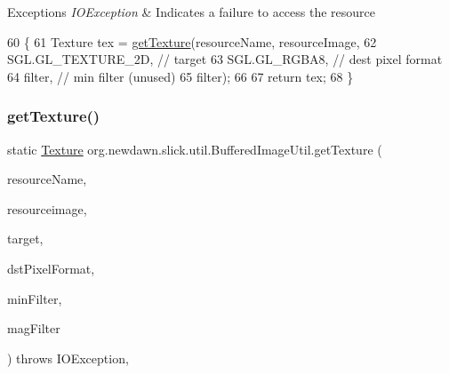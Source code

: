 \begin{DoxyExceptions}{Exceptions}
{\em I\+O\+Exception} & Indicates a failure to access the resource \\
\hline
\end{DoxyExceptions}

\begin{DoxyCode}
60                                                                         \{
61         Texture tex = \mbox{\hyperlink{classorg_1_1newdawn_1_1slick_1_1util_1_1_buffered_image_util_a60639f0e446fa211b987096681b98615}{getTexture}}(resourceName, resourceImage,
62                 SGL.GL\_TEXTURE\_2D, \textcolor{comment}{// target}
63                 SGL.GL\_RGBA8, \textcolor{comment}{// dest pixel format}
64                 filter, \textcolor{comment}{// min filter (unused)}
65                 filter);
66 
67         \textcolor{keywordflow}{return} tex;
68     \}
\end{DoxyCode}
\mbox{\label{classorg_1_1newdawn_1_1slick_1_1util_1_1_buffered_image_util_adeb7dc3f0a04a157bceb0a2e1aeaf57a}} 
\subsubsection{\texorpdfstring{get\+Texture()}{getTexture()}\hspace{0.1cm}{\footnotesize\ttfamily [3/3]}}
{\footnotesize\ttfamily static \mbox{\hyperlink{interfaceorg_1_1newdawn_1_1slick_1_1opengl_1_1_texture}{Texture}} org.\+newdawn.\+slick.\+util.\+Buffered\+Image\+Util.\+get\+Texture (\begin{DoxyParamCaption}\item[{String}]{resource\+Name,  }\item[{Buffered\+Image}]{resourceimage,  }\item[{int}]{target,  }\item[{int}]{dst\+Pixel\+Format,  }\item[{int}]{min\+Filter,  }\item[{int}]{mag\+Filter }\end{DoxyParamCaption}) throws I\+O\+Exception\hspace{0.3cm}{\ttfamily [inline]}, {\ttfamily [static]}}

